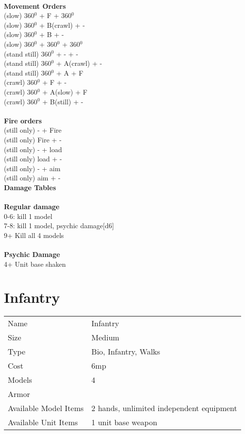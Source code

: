 \ \\ {\bf Movement Orders } \\
(slow) 360$^0$ + F + 360$^0$ \\
(slow) 360$^0$ + B(crawl) + - \\
(slow) 360$^0$ + B + - \\
(slow) 360$^0$ + 360$^0$ + 360$^0$ \\
(stand still) 360$^0$ + - + -  \\
(stand still) 360$^0$ + A(crawl) + - \\
(stand still) 360$^0$ + A + F \\
(crawl) 360$^0$ + F + - \\
(crawl) 360$^0$ + A(slow) + F \\
(crawl) 360$^0$ + B(still) + - \\
\ \\ {\bf Fire orders } \\
(still only) - + Fire \\
(still only) Fire + -  \\
(still only) - + load \\
(still only) load + - \\
(still only) - + aim \\
(still only) aim + -  \\



{\bf Damage Tables} \\
\ \\ {\bf Regular damage } \\
0-6: kill 1 model \\
7-8: kill 1 model, psychic damage[d6] \\
9+ Kill all 4 models \\
\ \\ {\bf Psychic Damage } \\
4+ Unit base shaken \\









\pagebreak

\section{ Infantry }

\begin{tabular}{ll}
  Name & Infantry \\
  Size & Medium\\
  Type & Bio, Infantry, Walks\\
  Cost & 6mp\\
  Models & 4\\
  Armor & \\
  Available Model Items & 2 hands, unlimited independent equipment \\
  Available Unit Items & 1 unit base weapon \\
\end{tabular}

